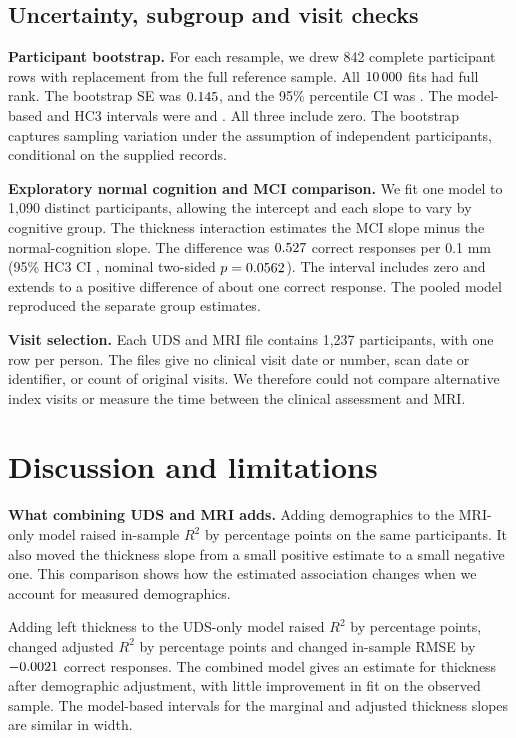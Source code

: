 \clearpage
\subsection{Uncertainty, subgroup and visit checks}
\textbf{Participant bootstrap.} For each resample, we drew 842 complete participant rows with replacement from the full reference sample. All \(10\,000\) fits had full rank. The bootstrap SE was \(0.145\), and the 95\% percentile CI was \BootstrapCI{}. The model-based and HC3 intervals were \FinalCI{} and \FinalHC{}. All three include zero. The bootstrap captures sampling variation under the assumption of independent participants, conditional on the supplied records.

\textbf{Exploratory normal cognition and MCI comparison.} We fit one model to 1,090 distinct participants, allowing the intercept and each slope to vary by cognitive group. The thickness interaction estimates the MCI slope minus the normal-cognition slope. The difference was \(0.527\) correct responses per 0.1 mm (95\% HC3 CI \InteractionCI{}, nominal two-sided \(p=0.0562\)). The interval includes zero and extends to a positive difference of about one correct response. The pooled model reproduced the separate group estimates.

\textbf{Visit selection.} Each UDS and MRI file contains 1,237 participants, with one row per person. The files give no clinical visit date or number, scan date or identifier, or count of original visits. We therefore could not compare alternative index visits or measure the time between the clinical assessment and MRI.

\section{Discussion and limitations}
\textbf{What combining UDS and MRI adds.} Adding demographics to the MRI-only model raised in-sample \(R^2\) by \UDSAddedR{} percentage points on the same participants. It also moved the thickness slope from a small positive estimate to a small negative one. This comparison shows how the estimated association changes when we account for measured demographics.

Adding left thickness to the UDS-only model raised \(R^2\) by \MRIAddedR{} percentage points, changed adjusted \(R^2\) by \MRIAddedAdjusted{} percentage points and changed in-sample RMSE by \(-0.0021\) correct responses. The combined model gives an estimate for thickness after demographic adjustment, with little improvement in fit on the observed sample. The model-based intervals for the marginal and adjusted thickness slopes are similar in width.

